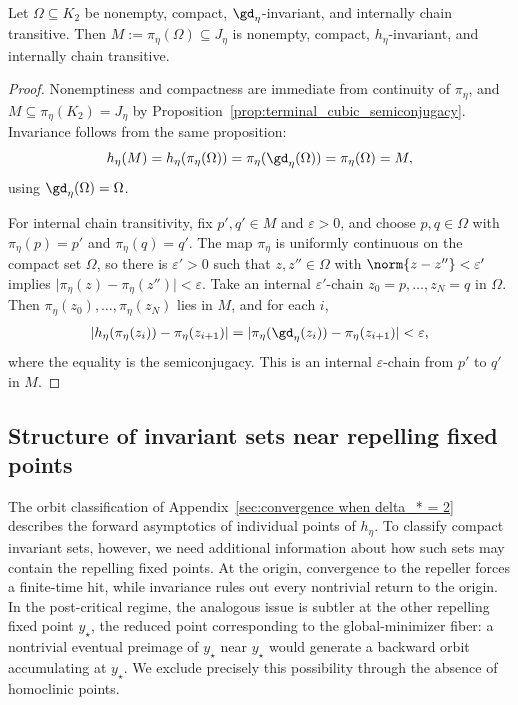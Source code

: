 \documentclass{article}
\begin{document}
\begin{lemma}
\label{lem:ict_pushdown_semiconjugacy}
Let $\Omega\subseteq K_2$ be nonempty, compact, $\gd_\eta$-invariant, and
internally chain transitive. Then $M:=\pi_\eta(\Omega)\subseteq J_\eta$ is
nonempty, compact, $h_\eta$-invariant, and internally chain transitive.
\end{lemma}

\begin{proof}
Nonemptiness and compactness are immediate from continuity of $\pi_\eta$, and
$M\subseteq\pi_\eta(K_2)=J_\eta$ by
Proposition~\ref{prop:terminal_cubic_semiconjugacy}. Invariance follows from
the same proposition:
\begin{align}
    h_\eta(M)=h_\eta(\pi_\eta(\Omega))=\pi_\eta(\gd_\eta(\Omega))=\pi_\eta(\Omega)=M,
\end{align}
using $\gd_\eta(\Omega)=\Omega$.

For internal chain transitivity, fix $p',q'\in M$ and $\varepsilon>0$, and
choose $p,q\in\Omega$ with $\pi_\eta(p)=p'$ and $\pi_\eta(q)=q'$. The map
$\pi_\eta$ is uniformly continuous on the compact set $\Omega$, so there is
$\varepsilon'>0$ such that $z,z''\in\Omega$ with $\norm{z-z''}<\varepsilon'$
implies $\lvert \pi_\eta(z)-\pi_\eta(z'')\rvert<\varepsilon$. Take an internal
$\varepsilon'$-chain $z_0=p,\dots,z_N=q$ in $\Omega$. Then
$\pi_\eta(z_0),\dots,\pi_\eta(z_N)$ lies in $M$, and for each $i$,
\begin{align}
    \lvert h_\eta(\pi_\eta(z_i))-\pi_\eta(z_{i+1})\rvert
    =
    \lvert \pi_\eta(\gd_\eta(z_i))-\pi_\eta(z_{i+1})\rvert
    <\varepsilon,
\end{align}
where the equality is the semiconjugacy. This is an internal
$\varepsilon$-chain from $p'$ to $q'$ in $M$.
\end{proof}

\subsection{Structure of invariant sets near repelling fixed points}
\label{subsec:repellers_homoclinic}

The orbit classification of
Appendix~\ref{sec:convergence when delta_* = 2} describes the forward
asymptotics of individual points of $h_\eta$. To classify compact invariant
sets, however, we need additional information about how such sets may contain
the repelling fixed points. At the origin, convergence to the repeller forces a
finite-time hit, while invariance rules out every nontrivial return to the
origin. In the post-critical regime, the analogous issue is subtler at the other
repelling fixed point $y_\star$, the reduced point corresponding to the
global-minimizer fiber: a nontrivial eventual preimage of $y_\star$ near
$y_\star$ would generate a backward orbit accumulating at $y_\star$. We exclude
precisely this possibility through the absence of homoclinic points.
\end{document}
